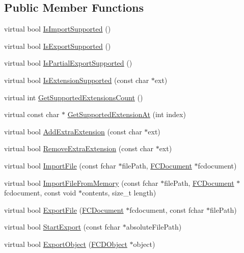 \subsection*{Public Member Functions}
\begin{DoxyCompactItemize}
\item 
virtual bool \hyperlink{classFArchiveXML_afaeaeb4ee3cd75bac1ad6a4c54c9b899}{IsImportSupported} ()
\item 
virtual bool \hyperlink{classFArchiveXML_adb1efee2caed4402a02dd20af432e5ef}{IsExportSupported} ()
\item 
virtual bool \hyperlink{classFArchiveXML_ad35bb5dd5d901c86edf794dda76bfc4d}{IsPartialExportSupported} ()
\item 
virtual bool \hyperlink{classFArchiveXML_a17673f93728bb30dedd2791473c4b14e}{IsExtensionSupported} (const char $\ast$ext)
\item 
virtual int \hyperlink{classFArchiveXML_a0547ef1565f6543319b9aaad3eca8697}{GetSupportedExtensionsCount} ()
\item 
virtual const char $\ast$ \hyperlink{classFArchiveXML_a3908cc84df654da0ded836afcfd7fab8}{GetSupportedExtensionAt} (int index)
\item 
virtual bool \hyperlink{classFArchiveXML_adb22e0884d6059ded32d194a8cdde4dc}{AddExtraExtension} (const char $\ast$ext)
\item 
virtual bool \hyperlink{classFArchiveXML_ad1e57b1a3067f88738ee7a2f0e6fc9ca}{RemoveExtraExtension} (const char $\ast$ext)
\item 
virtual bool \hyperlink{classFArchiveXML_a10bc809b2a64d9df0cd83742bf0dc49a}{ImportFile} (const fchar $\ast$filePath, \hyperlink{classFCDocument}{FCDocument} $\ast$fcdocument)
\item 
virtual bool \hyperlink{classFArchiveXML_a5a85deaaf25379ea56b30d5a602ae949}{ImportFileFromMemory} (const fchar $\ast$filePath, \hyperlink{classFCDocument}{FCDocument} $\ast$fcdocument, const void $\ast$contents, size\_\-t length)
\item 
virtual bool \hyperlink{classFArchiveXML_ab7c6e1fab043617e8e6adebf947dcf7e}{ExportFile} (\hyperlink{classFCDocument}{FCDocument} $\ast$fcdocument, const fchar $\ast$filePath)
\item 
virtual bool \hyperlink{classFArchiveXML_a485fad9bad65ed0e6512f9713223982f}{StartExport} (const fchar $\ast$absoluteFilePath)
\item 
virtual bool \hyperlink{classFArchiveXML_a36eff362143c86cae961237d4923a35a}{ExportObject} (\hyperlink{classFCDObject}{FCDObject} $\ast$object)

\end{DoxyCompactItemize}
